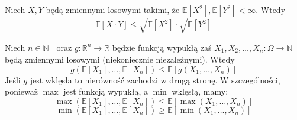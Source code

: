 \begin{inequality}\label{inequality:Cauchy_Schwarz}
Niech $X,Y$ będą zmiennymi losowymi takimi, że $\mathbb{E}[X^2],\mathbb{E}[Y^2]< \infty$. Wtedy
\[
    \mathbb{E}[X\cdot Y] \le \sqrt{\mathbb{E}[X^2]}\cdot \sqrt{\mathbb{E}[Y^2]}
\]
\end{inequality}

\begin{inequality}\label{inequality:Jensen} 
Niech $n\in\mathbb{N}_+$ oraz $g:\mathbb{R}^n\to\mathbb{R}$ będzie funkcją wypukłą zaś $X_1,X_2,\dots, X_n:\Omega\to\mathbb{N}$ będą zmiennymi losowymi (niekoniecznie niezależnymi). Wtedy
\[
    g(\mathbb{E}[X_1],\dots, \mathbb{E}[X_n]) \le \mathbb{E}[g(X_1,\dots,X_n)]
\]
Jeśli $g$ jest wklęsła to nierówność zachodzi w drugą stronę. W szczególności, ponieważ $\max$ jest funkcją wypukłą, a $\min$ wklęsłą, mamy:
\[
    \max(\mathbb{E}[X_1],\dots, \mathbb{E}[X_n]) \le \mathbb{E}[\max(X_1,\dots,X_n)]
\]
\[
    \min(\mathbb{E}[X_1],\dots, \mathbb{E}[X_n]) \ge \mathbb{E}[\min(X_1,\dots,X_n)]
\]
\end{inequality}